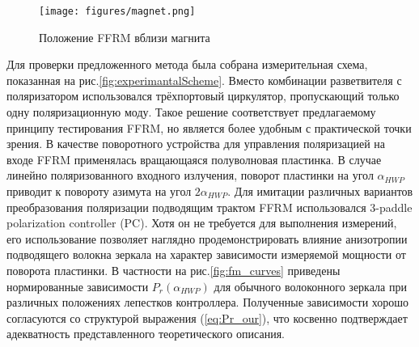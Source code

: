 \documentclass{article}
\begin{document}
\begin{figure}[b]
	\centering
	\texttt{[image: figures/magnet.png]}
	\caption{Положение FFRM вблизи магнита}
	\label{fig:magnet}
\end{figure}

Для проверки предложенного метода была собрана измерительная схема, показанная на рис.\ref{fig:experimantalScheme}.
Вместо комбинации разветвителя с поляризатором использовался трёхпортовый циркулятор, пропускающий только одну поляризационную моду.
Такое решение соответствует предлагаемому принципу тестирования FFRM, но является более удобным с практической точки зрения.
В качестве поворотного устройства для управления поляризацией на входе FFRM применялась вращающаяся полуволновая пластинка.
В случае линейно поляризованного входного излучения, поворот пластинки на угол $\alpha_{HWP}$ приводит к повороту азимута на угол $2\alpha_{HWP}$. 
Для имитации различных вариантов преобразования поляризации подводящим трактом FFRM использовался  3-paddle polarization controller (PC).
Хотя он не требуется для выполнения измерений, его использование позволяет наглядно продемонстрировать влияние анизотропии подводящего волокна зеркала на характер зависимости измеряемой мощности от поворота пластинки.
В частности на рис.\ref{fig:fm_curves} приведены нормированные зависимости $P_r(\alpha_{HWP})$ для обычного волоконного зеркала при различных положениях лепестков контроллера.
Полученные зависимости хорошо согласуются со структурой выражения (\ref{eq:Pr_our}), что косвенно подтверждает адекватность представленного теоретического описания.
\end{document}
